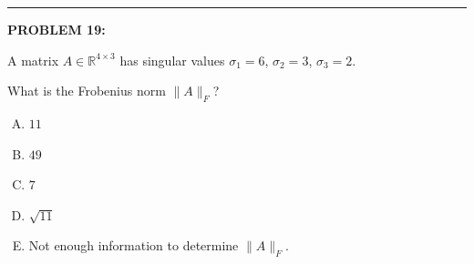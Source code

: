 \documentclass[12pt]{amsart}
\newcommand{\divider}{
  \vspace{-1em} %
  \noindent
  \raisebox{-0.15ex}{\textbullet}%
  \hspace{0.5em}%
  \rule[0.5ex]{0.95\textwidth}{1.0pt}%
  \hspace{0.5em}%
  \raisebox{-0.15ex}{\textbullet}%
  \vspace{0em} %
}
\begin{document}
% 
% 
% 
% 

\divider




{\bf PROBLEM 19:}

A matrix $A \in \mathbb{R}^{4 \times 3}$ has singular values $\sigma_1 = 6$, $\sigma_2 = 3$, $\sigma_3 = 2$.

What is the Frobenius norm $\|A\|_F$?

\begin{enumerate}[(A)]
\item $11$
\item $49$
\item $7$
\item $\sqrt{11}$
\item Not enough information to determine $\|A\|_F$.
\end{enumerate}
\end{document}
